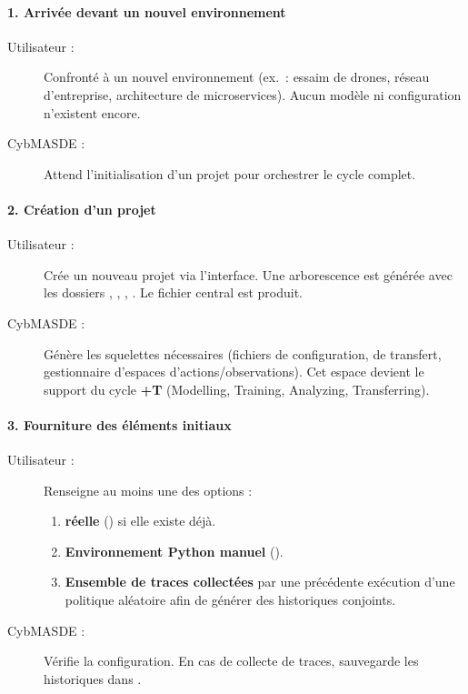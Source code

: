 \paragraph{1. Arrivée devant un nouvel environnement}
\begin{description}
  \item[Utilisateur :] Confronté à un nouvel environnement (ex.~: essaim de drones, réseau d'entreprise, architecture de microservices). Aucun modèle ni configuration n'existent encore.
  \item[CybMASDE :] Attend l'initialisation d'un projet pour orchestrer le cycle complet.
\end{description}

\paragraph{2. Création d'un projet}
\begin{description}
  \item[Utilisateur :] Crée un nouveau projet via l'interface. Une arborescence est générée avec les dossiers , , , . Le fichier central  est produit.
  \item[CybMASDE :] Génère les squelettes nécessaires (fichiers de configuration,  de transfert, gestionnaire d'espaces d'actions/observations). Cet espace devient le support du cycle \textbf{+T} (Modelling, Training, Analyzing, Transferring).
\end{description}

\paragraph{3. Fourniture des éléments initiaux}
\begin{description}
  \item[Utilisateur :] Renseigne au moins une des options :
    \begin{enumerate}
      \item \textbf{ réelle} () si elle existe déjà.
      \item \textbf{Environnement Python manuel} ().
      \item \textbf{Ensemble de traces collectées} par une précédente exécution d'une politique aléatoire afin de générer des historiques conjoints.
    \end{enumerate}
  \item[CybMASDE :] Vérifie la configuration. En cas de collecte de traces, sauvegarde les historiques dans .
\end{description}

